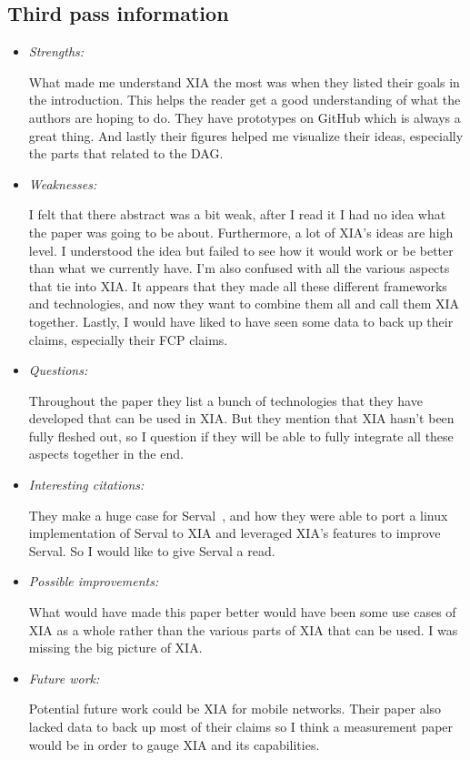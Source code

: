 \documentclass[letterpaper,twocolumn,10pt]{article}
\begin{document}
\subsection{Third pass information}
\label{sec:third}
\begin{itemize}

\item {\it Strengths:} 

What made me understand XIA the most was when they listed their goals in the introduction. This helps the 
reader get a good understanding of what the authors are hoping to do. They have prototypes on GitHub which is 
always a great thing. And lastly their figures helped me visualize their ideas, especially the parts that related to the 
DAG. 

\item {\it Weaknesses:}

I felt that there abstract was a bit weak, after I read it I had no idea what the paper was going to be about. Furthermore,
a lot of XIA's ideas are high level. I understood the idea but failed to see how it would work or be better than what we
currently have. I'm also confused with all the various aspects that tie into XIA. It appears that they made all these 
different frameworks and technologies, and now they want to combine them all and call them XIA together. Lastly, I 
would have liked to have seen some data to back up their claims, especially their FCP claims. 

\item {\it Questions:}

Throughout the paper they list a bunch of technologies that they have developed that can be used in XIA.
But they mention that XIA hasn't been fully fleshed out, so I question if they will be able to fully integrate 
all these aspects together in the end. 

\item {\it Interesting citations:} 

They make a huge case for Serval~\cite{serval}, and how they were able to port a linux implementation 
of Serval to XIA and leveraged XIA's features to improve Serval. So I would like to give Serval a read. 

\item {\it Possible improvements:} 

What would have made this paper better would have been some use cases of XIA as a whole 
rather than the various parts of XIA that can be used. I was missing the big picture of XIA. 

\item {\it Future work:} 

Potential future work could be XIA for mobile networks. Their paper also lacked data to back up most of their claims
so I think a measurement paper would be in order to gauge XIA and its capabilities. 

\end{itemize}

{
  \small 
  
  
}
\end{document}
